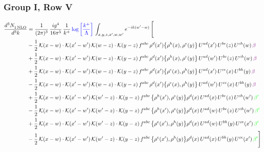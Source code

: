 \documentclass[9pt]{article}
\numberwithin{equation}{section}
\begin{document}
\subsubsection{Group I, Row V}
\begin{align}
    \frac{d^{3}N_{1\,\rm NLO}^{\rm}}{d^{3}k}  & = \frac{1}{(2\pi)^{3}}\, \frac{ig^{4}}{16\pi^{5}}\, \frac{1}{k^{+}}\, {\color{blue}\log{\left[\frac{k^{+}}{\Lambda}\right]}}\,\int_{x,y,z,x^{\prime},w,w^{\prime}}e^{-ik(w^{\prime}-w)}\, \Bigg[\notag \\ & -\frac{1}{2}\,\mathcal{K}(x-w)\cdot\mathcal{K}(x'-w')\,\mathcal{K}(w-z)\cdot\mathcal{K}(y-z)\, f^{abc}\,\rho^{d}(x')\big\{\rho^{h}(x),\rho^{e}(y)\big\}\,U^{ad}(x')\,U^{be}(z)\,U^{ch}(w)\,{\color{violet} \beta}\notag\\ & +\frac{1}{2}\,\mathcal{K}(x-w)\cdot\mathcal{K}(x'-w')\,\mathcal{K}(w-z)\cdot\mathcal{K}(y-z)\, f^{abc}\,\rho^{d}(x')\big\{\rho^{h}(x),\rho^{e}(y)\big\}\,U^{ad}(w')\,U^{be}(z)\,U^{ch}(w)\,{\color{violet} \beta}\notag\\ &+\frac{1}{2}\,\mathcal{K}(x-w)\cdot\mathcal{K}(x'-w')\,\mathcal{K}(w-z)\cdot\mathcal{K}(y-z)\, f^{abc}\,\rho^{d}(x')\big\{\rho^{e}(x),\rho^{h}(y)\big\}\,U^{ad}(x')\,U^{ce}(x)\,U^{bh}(y)\,{\color{violet} \beta}\notag\\ & -\frac{1}{2}\,\mathcal{K}(x-w)\cdot\mathcal{K}(x'-w')\,\mathcal{K}(w-z)\cdot\mathcal{K}(y-z)\, f^{abc}\,\rho^{d}(x')\big\{\rho^{e}(x),\rho^{h}(y)\big\}\,U^{ad}(w')\,U^{ce}(x)\,U^{bh}(y)\,{\color{violet} \beta}\notag\\ & +\frac{1}{2}\,\mathcal{K}(x-w)\cdot\mathcal{K}(x'-w')\,\mathcal{K}(w'-z)\cdot\mathcal{K}(y-z)\, f^{abc}\,\big\{\rho^{h}(x'),\rho^{e}(y)\big\}\rho^{d}(x)\,U^{ad}(x)\,U^{be}(z)\,U^{ch}(w')\,{\color{green} \beta'}\notag\\ &-\frac{1}{2}\,\mathcal{K}(x-w)\cdot\mathcal{K}(x'-w')\,\mathcal{K}(w'-z)\cdot\mathcal{K}(y-z)\, f^{abc}\,\big\{\rho^{h}(x'),\rho^{e}(y)\big\}\rho^{d}(x)\,U^{ad}(w)\,U^{be}(z)\,U^{ch}(w')\,{\color{green} \beta'}\notag\\ & +\frac{1}{2}\,\mathcal{K}(x-w)\cdot\mathcal{K}(x'-w')\,\mathcal{K}(w'-z)\cdot\mathcal{K}(y-z)\, f^{abc}\,\big\{\rho^{e}(x'),\rho^{h}(y)\big\}\rho^{d}(x)\,U^{ad}(w)\,U^{bh}(y)\,U^{ce}(x')\,{\color{green} \beta'}\notag\\ &-\frac{1}{2}\,\mathcal{K}(x-w)\cdot\mathcal{K}(x'-w')\,\mathcal{K}(w'-z)\cdot\mathcal{K}(y-z)\, f^{abc}\,\big\{\rho^{e}(x'),\rho^{h}(y)\big\}\rho^{d}(x)\,U^{ad}(x)\,U^{bh}(y)\,U^{ce}(x')\,{\color{green} \beta'} \Bigg]
\end{align}
\end{document}
